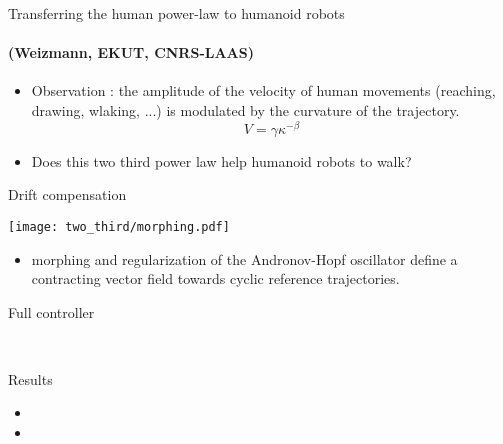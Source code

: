 

\begin{frame}{Transferring the human power-law to humanoid robots}
  \framesubtitle{(Weizmann, EKUT, CNRS-LAAS) }
  \begin{itemize}
    \item Observation : the amplitude of the velocity of human movements (reaching, drawing, wlaking, ...) is modulated by the curvature of the trajectory.
    \begin{equation}
      V = \gamma \kappa ^{-\beta}
    \end{equation}
    \item Does this two third power law help humanoid robots to walk?
  \end{itemize}
\end{frame}

\begin{frame}{Drift compensation}
  \begin{center}
    \texttt{[image: two\_third/morphing.pdf]}
  \end{center}
  \vspace*{-1cm}
  \begin{itemize}
    \item morphing and regularization of the Andronov-Hopf oscillator define a contracting vector field towards cyclic reference trajectories.
  \end{itemize}
\end{frame}

\begin{frame}{Full controller}
  \begin{center}
    \scalebox{0.7}{} \\
  \end{center}
\end{frame}

\begin{frame}{Results}
  \begin{itemize}
    \item
    \item
  \end{itemize}
\end{frame}